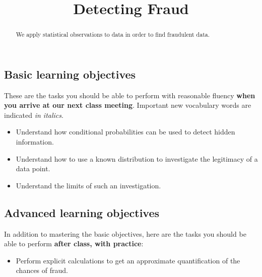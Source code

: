 \documentclass{ximera}
\title{Detecting Fraud}
\begin{document}
\begin{abstract}
We apply statistical observations to data in order to find fraudulent data.
\end{abstract}
\maketitle

\subsection*{Basic learning objectives}

These are the tasks you should be able to perform with reasonable fluency \textbf{when you arrive at our next class meeting}. Important new vocabulary words are indicated \emph{in italics}. 

\begin{itemize}
	\item Understand how conditional probabilities can be used to detect hidden information.
	\item Understand how to use a known distribution to investigate the legitimacy of a data point.
    \item Understand the limits of such an investigation.
\end{itemize}

\subsection*{Advanced learning objectives}

In addition to mastering the basic objectives, here are the tasks you should be able to perform \textbf{after class, with practice}: 

\begin{itemize}
    \item Perform explicit calculations to get an approximate quantification of the chances of fraud.
\end{itemize}
\end{document}
